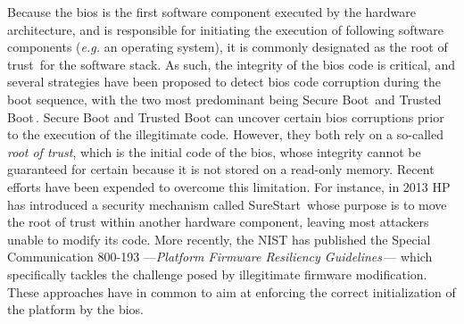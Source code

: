 Because the \ac{bios} is the first software component executed by the hardware
architecture, and is responsible for initiating the execution of following
software components (\emph{e.g.} an operating system), it is commonly designated
as the root of trust\,\cite{rutkowska2015intel} for the software stack.
%
As such, the integrity of the \ac{bios} code is critical, and several strategies
have been proposed to detect \ac{bios} code corruption during the boot sequence,
with the two most predominant being Secure Boot\,\cite{rosenbaum2012secboot} and
Trusted Boot\,\cite{trustedboot}.
%
Secure Boot and Trusted Boot can uncover certain \ac{bios} corruptions prior to
the execution of the illegitimate code.
%
However, they both rely on a so-called \emph{root of trust}, which is the
initial code of the \ac{bios}, whose integrity cannot be guaranteed for certain
because it is not stored on a read-only memory.
%
Recent efforts have been expended to overcome this limitation.
%
For instance, in 2013 HP has introduced a security mechanism called
SureStart\,\cite{hp2016surestart} whose purpose is to move the root of trust
within another hardware component, leaving most attackers unable to modify its
code.
%
More recently, the NIST has published the Special Communication 800-193
---\emph{Platform Firmware Resiliency
  Guidelines}\,\cite{regenscheid2018nist800193}--- which specifically tackles
the challenge posed by illegitimate firmware modification.
%
These approaches have in common to aim at enforcing the correct initialization
of the platform by the \ac{bios}.

